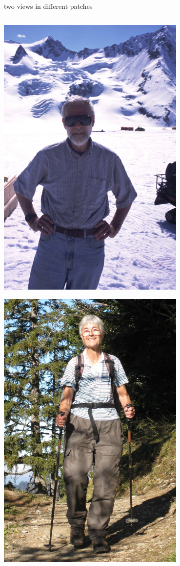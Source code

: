 \documentclass[10pt,hyperref,dvipsnames]{beamer}
\begin{document}
\begin{frame}{two views in different patches}

\begin{columns}
\begin{column}{0.25\textwidth}
\includegraphics[width=0.7\textwidth]{figs/Will-by-Truffer.jpg}

\vspace{5mm}
\includegraphics[width=0.7\textwidth]{figs/Iken_front_crop.jpg}


\end{column}
\end{columns}
\end{frame}
\end{document}
